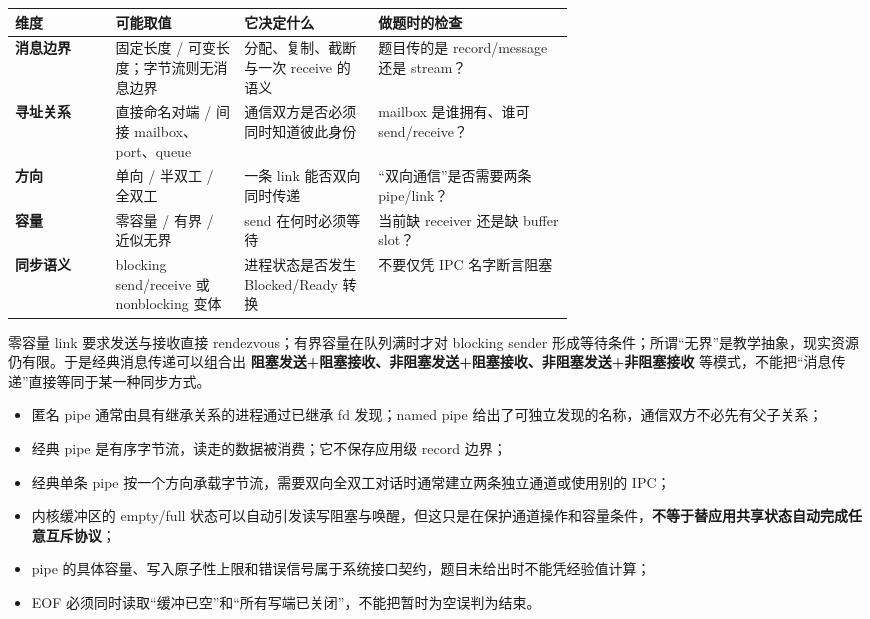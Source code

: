 \documentclass[11pt,a4paper]{ctexart}
\newcommand{\kw}[1]{\textbf{#1}}
\begin{document}
\begingroup
\small
\renewcommand{\arraystretch}{1.23}
\setlength{\tabcolsep}{4pt}
\begin{tabularx}{\linewidth}{>{\bfseries}p{0.18\linewidth} p{0.23\linewidth} p{0.24\linewidth} X}
\toprule
维度 & 可能取值 & 它决定什么 & 做题时的检查\\
\midrule
消息边界 & 固定长度 / 可变长度；字节流则无消息边界 & 分配、复制、截断与一次 receive 的语义 & 题目传的是 record/message 还是 stream？\\
寻址关系 & 直接命名对端 / 间接 mailbox、port、queue & 通信双方是否必须同时知道彼此身份 & mailbox 是谁拥有、谁可 send/receive？\\
方向 & 单向 / 半双工 / 全双工 & 一条 link 能否双向同时传递 & “双向通信”是否需要两条 pipe/link？\\
容量 & 零容量 / 有界 / 近似无界 & send 在何时必须等待 & 当前缺 receiver 还是缺 buffer slot？\\
同步语义 & blocking send/receive 或 nonblocking 变体 & 进程状态是否发生 Blocked/Ready 转换 & 不要仅凭 IPC 名字断言阻塞\\
\bottomrule
\end{tabularx}
\endgroup

零容量 link 要求发送与接收直接 rendezvous；有界容量在队列满时才对 blocking sender 形成等待条件；所谓“无界”是教学抽象，现实资源仍有限。于是经典消息传递可以组合出 \kw{阻塞发送+阻塞接收、非阻塞发送+阻塞接收、非阻塞发送+非阻塞接收} 等模式，不能把“消息传递”直接等同于某一种同步方式。

\begin{exam}
\begin{itemize}
\item 匿名 pipe 通常由具有继承关系的进程通过已继承 fd 发现；named pipe 给出了可独立发现的名称，通信双方不必先有父子关系；
\item 经典 pipe 是有序字节流，读走的数据被消费；它不保存应用级 record 边界；
\item 经典单条 pipe 按一个方向承载字节流，需要双向全双工对话时通常建立两条独立通道或使用别的 IPC；
\item 内核缓冲区的 empty/full 状态可以自动引发读写阻塞与唤醒，但这只是在保护通道操作和容量条件，\kw{不等于替应用共享状态自动完成任意互斥协议}；
\item pipe 的具体容量、写入原子性上限和错误信号属于系统接口契约，题目未给出时不能凭经验值计算；
\item EOF 必须同时读取“缓冲已空”和“所有写端已关闭”，不能把暂时为空误判为结束。
\end{itemize}
\end{exam}
\end{document}
